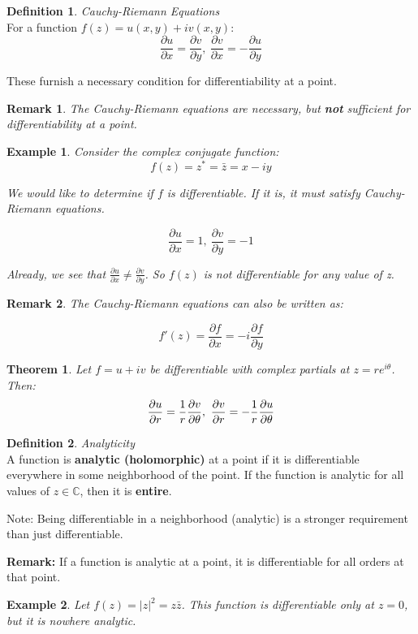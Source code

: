 \documentclass{article}
\newtheorem{theorem}{Theorem}[section]
\newtheorem{ex}{Example}
\newtheorem*{remark}{Remark}
\theoremstyle{definition}
\newtheorem{definition}{Definition}[section]
\newcommand{\Def}[2]{
\begin{shaded*}
\begin{definition}{\textit{#1}}\\#2\end{definition}
\end{shaded*}
}
\def\C{\mathbb{C}}
\begin{document}
\Def{Cauchy-Riemann Equations}{For a function $f(z) = u(x,y)+iv(x,y)$:
	$$\frac{\partial u}{\partial x} = \frac{\partial v}{\partial y},\ \frac{\partial v}{\partial x} = -\frac{\partial u}{\partial y}$$
	
	These furnish a necessary condition for differentiability at a point.
	
	\begin{remark}
		The Cauchy-Riemann equations are necessary, but \textbf{not} sufficient for differentiability at a point.
\end{remark}}

\begin{ex} Consider the complex conjugate function:
	$$f(z) = z^* = \bar{z} = x-iy$$
	
	We would like to determine if $f$ is differentiable. If it is, it must satisfy Cauchy-Riemann equations.
	
	$$\frac{\partial u}{\partial x} = 1,\ \frac{\partial v}{\partial y} = -1$$
	
	Already, we see that $\frac{\partial u}{\partial x} \neq \frac{\partial v}{\partial y}$. So $f(z)$ is not differentiable for any value of z.
\end{ex}

\begin{remark}
The Cauchy-Riemann equations can also be written as:

$$f'(z) = \frac{\partial f}{\partial x} = -i \frac{\partial f}{\partial y}$$

\end{remark}


\begin{theorem}
	Let $f=u+iv$ be differentiable with complex partials at $z=re^{i\theta}$. Then:
	$$\pdv{u}{r} = \frac{1}{r} \pdv{v}{\theta},\ \pdv{v}{r} = -\frac{1}{r} \pdv{u}{\theta}$$
\end{theorem}


\Def{Analyticity}{A function is \textbf{analytic (holomorphic) }at a point if it is differentiable everywhere in some neighborhood of the point. If the function is analytic for all values of $z \in \C$, then it is \textbf{entire}. 
	
Note: Being differentiable in a neighborhood (analytic) is a stronger requirement than just differentiable. 

\textbf{Remark:} If a function is analytic at a point, it is differentiable for all orders at that point.
}


\begin{ex} Let 
$f(z) = |z|^2 = z \bar{z}$. This function is differentiable only at $z=0$, but it is nowhere analytic. 
\end{ex}
\end{document}
